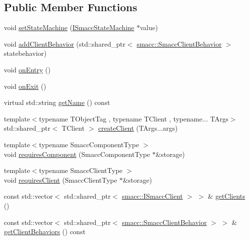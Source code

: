 \subsection*{Public Member Functions}
\begin{DoxyCompactItemize}
\item 
void \hyperlink{classsmacc_1_1Orthogonal_a05f65c01344a6c8593f7f88c0ca19654}{set\+State\+Machine} (\hyperlink{classsmacc_1_1ISmaccStateMachine}{I\+Smacc\+State\+Machine} $\ast$value)
\item 
void \hyperlink{classsmacc_1_1Orthogonal_a729460fd4ac0ecc24cc89623e6f5c0b5}{add\+Client\+Behavior} (std\+::shared\+\_\+ptr$<$ \hyperlink{classsmacc_1_1SmaccClientBehavior}{smacc\+::\+Smacc\+Client\+Behavior} $>$ statebehavior)
\item 
void \hyperlink{classsmacc_1_1Orthogonal_a77888104f276bdbd177d69cf23f11a56}{on\+Entry} ()
\item 
void \hyperlink{classsmacc_1_1Orthogonal_a71c0df3d9e8327e65286e1ce0a3a7043}{on\+Exit} ()
\item 
virtual std\+::string \hyperlink{classsmacc_1_1Orthogonal_ae1ad57a2fda4d7f2ecf708c342fc1bb9}{get\+Name} () const 
\item 
{\footnotesize template$<$typename T\+Object\+Tag , typename T\+Client , typename... T\+Args$>$ }\\std\+::shared\+\_\+ptr$<$ T\+Client $>$ \hyperlink{classsmacc_1_1Orthogonal_a8676cb5a7fe77d5ba1ddca2c2f4946df}{create\+Client} (T\+Args...\+args)
\item 
{\footnotesize template$<$typename Smacc\+Component\+Type $>$ }\\void \hyperlink{classsmacc_1_1Orthogonal_a433bda80701bebd5d801685d31b08115}{requires\+Component} (Smacc\+Component\+Type $\ast$\&storage)
\item 
{\footnotesize template$<$typename Smacc\+Client\+Type $>$ }\\void \hyperlink{classsmacc_1_1Orthogonal_abcde9f489cdf94acca381ea67649a723}{requires\+Client} (Smacc\+Client\+Type $\ast$\&storage)
\item 
const std\+::vector$<$ std\+::shared\+\_\+ptr$<$ \hyperlink{classsmacc_1_1ISmaccClient}{smacc\+::\+I\+Smacc\+Client} $>$ $>$ \& \hyperlink{classsmacc_1_1Orthogonal_aee5bcdacccdc3450785983fe58e11d1b}{get\+Clients} ()
\item 
const std\+::vector$<$ std\+::shared\+\_\+ptr$<$ \hyperlink{classsmacc_1_1SmaccClientBehavior}{smacc\+::\+Smacc\+Client\+Behavior} $>$ $>$ \& \hyperlink{classsmacc_1_1Orthogonal_a9c0939a24078adfb96c4c1d198cea038}{get\+Client\+Behaviors} () const 
\end{DoxyCompactItemize}
